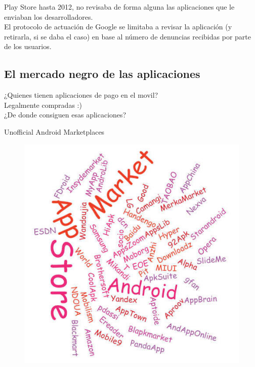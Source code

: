 \documentclass[12pt]{beamer} %
\begin{document}
\begin{slide}

 Play Store hasta 2012, no revisaba de forma alguna las aplicaciones que le enviaban los desarrolladores. \\
 El protocolo de actuación de Google se limitaba a revisar la aplicación (y retirarla, si se daba el caso)
 en base al número de denuncias recibidas por parte de los usuarios.
\end{slide}

\subsection{El mercado negro de las aplicaciones}

\begin{slide}

 ¿Quienes tienen aplicaciones de pago en el movil?\pause \\
 Legalmente compradas :) \pause \\
 ¿De donde consiguen esas aplicaciones?
  
\end{slide}


\begin{slide}
            Unofficial Android Marketplaces
    \begin{figure}[h]
      \includegraphics[height=0.9\textheight]{img/MyCloud.jpeg}
    \end{figure}
\end{slide}
\end{document}
